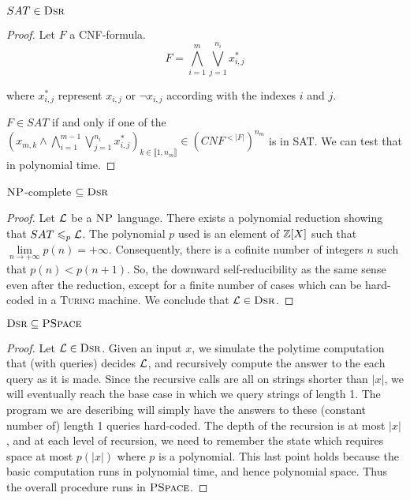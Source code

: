 \begin{propo}
    $SAT \in \textsc{Dsr}$
\end{propo}
\begin{proof}
    Let $F$ a CNF-formula.
    $$
        F=\bigwedge\limits_{i=1}^m \bigvee\limits_{j=1}^{n_i} x_{i,j}^*
    $$
    
    where $x_{i,j}^*$ represent $x_{i,j}$ or $\neg x_{i,j}$ according with the indexes $i$ and $j$.
    
    $F \in SAT$ if and only if one of the $\left(x_{m,k} \wedge \bigwedge\limits_{i=1}^{m-1} \bigvee\limits_{j=1}^{n_i} x_{i,j}^* \right)_{k\in\llbracket 1,n_m\rrbracket} \in \left(CNF^{<\vert F \vert}\right)^{n_m    }$ is in SAT. We can test that in polynomial time.
\end{proof}
\begin{corol}
    $\textsc{NP}$-complete $\subseteq \textsc{Dsr}$
\end{corol}
\begin{proof}
    Let $\mathcal{L}$ be a $\textsc{NP}$ language. There exists a polynomial reduction showing that $SAT \leqslant_p \mathcal{L}$. The polynomial $p$ used is an element of $\mathbb{Z}[X]$ such that $\lim\limits_{n\to +\infty} p(n) = +\infty$. Consequently, there is a cofinite number of integers $n$ such that $p(n)<p(n+1)$. So, the downward self-reducibility as the same sense even after the reduction, except for a finite number of cases which can be hard-coded in a \textsc{Turing} machine. We conclude that $\mathcal{L} \in \textsc{Dsr}$.
\end{proof}

\begin{propo}
    $\textsc{Dsr} \subseteq \textsc{PSpace}$
\end{propo}
\begin{proof}
    Let $\mathcal{L} \in \textsc{Dsr}$. Given an input $x$, we simulate the polytime computation that (with queries) decides $\mathcal{L}$, and recursively compute the answer to the each query as it is made. Since the recursive calls are all on strings shorter than $\vert x \vert$, we will eventually reach the base case in which we query strings of length 1. The program we are describing will simply have the answers to these (constant number of) length 1 queries hard-coded. The depth of the recursion is at most $\vert x \vert$, and at each level of recursion, we need to remember the state which requires space at most $p(\vert x\vert)$ where $p$ is a polynomial. This last point holds because the basic computation runs in polynomial time, and hence polynomial space. Thus the overall procedure runs in $\textsc{PSpace}$.
\end{proof}


